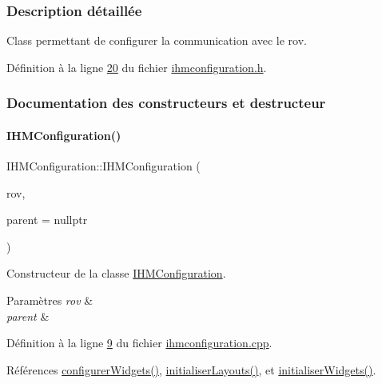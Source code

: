 \subsubsection{Description détaillée}
Class permettant de configurer la communication avec le rov. 

Définition à la ligne \hyperlink{ihmconfiguration_8h_source_l00020}{20} du fichier \hyperlink{ihmconfiguration_8h_source}{ihmconfiguration.\+h}.



\subsubsection{Documentation des constructeurs et destructeur}
\mbox{\label{class_i_h_m_configuration_a1532c281d170546071352cfe05feb1b8}} 
\paragraph{\texorpdfstring{I\+H\+M\+Configuration()}{IHMConfiguration()}}
{\footnotesize\ttfamily I\+H\+M\+Configuration\+::\+I\+H\+M\+Configuration (\begin{DoxyParamCaption}\item[{\hyperlink{class_rov}{Rov} $\ast$}]{rov,  }\item[{\hyperlink{class_q_widget}{Q\+Widget} $\ast$}]{parent = {\ttfamily nullptr} }\end{DoxyParamCaption})}



Constructeur de la classe \hyperlink{class_i_h_m_configuration}{I\+H\+M\+Configuration}. 


\begin{DoxyParams}{Paramètres}
{\em rov} & \\
\hline
{\em parent} & \\
\hline
\end{DoxyParams}


Définition à la ligne \hyperlink{ihmconfiguration_8cpp_source_l00009}{9} du fichier \hyperlink{ihmconfiguration_8cpp_source}{ihmconfiguration.\+cpp}.



Références \hyperlink{ihmconfiguration_8cpp_source_l00033}{configurer\+Widgets()}, \hyperlink{ihmconfiguration_8cpp_source_l00051}{initialiser\+Layouts()}, et \hyperlink{ihmconfiguration_8cpp_source_l00023}{initialiser\+Widgets()}.


